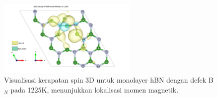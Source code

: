 \begin{figure}[h!]
    \centering
    \includegraphics[width=0.6\textwidth]{gambar_hasil/hBN_spin_BB_1225K.png}
    \caption{Visualisasi kerapatan spin 3D untuk monolayer hBN dengan defek B$_N$ pada 1225K, menunjukkan lokalisasi momen magnetik.}
    \label{fig:hbn_BB_1225K_spindensity}
\end{figure}

